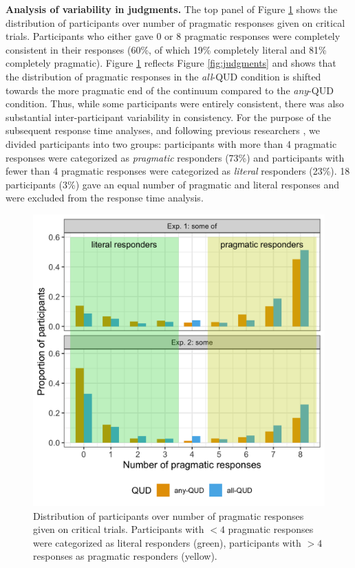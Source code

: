 \documentclass[10pt,letterpaper]{article}
\newcommand{\figref}[1]{Figure \ref{#1}}
\begin{document}
\noindent \textbf{Analysis of variability in judgments.} The top panel of \figref{fig:proportion} shows the distribution of participants over number of pragmatic responses given on critical trials. Participants who either gave 0 or 8 pragmatic responses were completely consistent in their responses (60\%, of which 19\% completely literal and 81\% completely pragmatic). \figref{fig:proportion} reflects \figref{fig:judgments} and shows that the distribution of pragmatic responses in the \emph{all}-QUD condition is shifted towards the more pragmatic end of the continuum compared to the \emph{any}-QUD condition. Thus, while some participants were entirely consistent, there was also substantial inter-participant variability in consistency. For the purpose of the subsequent response time analyses, and following previous researchers \cite{BottNoveck2004,DegenTanenhaus2015}, we divided participants into two groups:  participants with more than 4 pragmatic responses were categorized as \emph{pragmatic} responders (73\%) and participants with fewer than 4 pragmatic responses were categorized as \emph{literal} responders (23\%). 18 participants (3\%) gave an equal number of pragmatic and literal responses and were excluded from the response time analysis.


\begin{figure}
  \includegraphics[width=\linewidth]{plots/proportion.png}
  \caption{Distribution of participants over number of pragmatic responses given on critical trials. Participants with $< 4$ pragmatic responses were categorized as literal responders (green), participants with $> 4$ responses as pragmatic responders (yellow). }
  \label{fig:proportion}
\end{figure}
\end{document}
